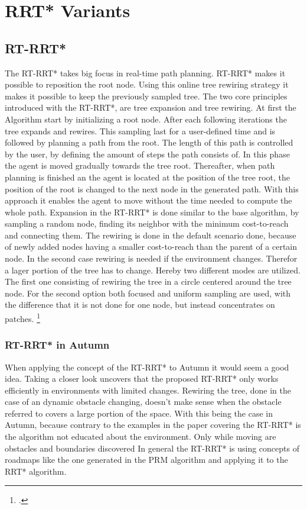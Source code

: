 \section{RRT* Variants}

\subsection{RT-RRT*}

The RT-RRT* takes big focus in real-time path planning. RT-RRT* makes it possible to reposition the root node. Using this online tree rewiring strategy it makes it possible to keep the previously sampled tree.
The two core principles introduced with the RT-RRT*, are tree expansion and tree rewiring. 
At first the Algorithm start by initializing a root node. After each following iterations the tree expands and rewires. This sampling last for a user-defined time and is followed by planning a path from the root. The length of this path is controlled by the user, by defining the amount of steps the path consists of. In this phase the agent is moved gradually towards the tree root. Thereafter, when path planning is finished an the agent is located at the position of the tree root, the position of the root is changed to the next node in the generated path. With this approach it enables the agent to move without the time needed to compute the whole path.
Expansion in the RT-RRT* is done similar to the base algorithm, by sampling a random node, finding its neighbor with the minimum cost-to-reach and connecting them.
The rewiring is done in the default scenario done, because of newly added nodes having a smaller cost-to-reach than the parent of a certain node. In the second case rewiring is needed if the environment changes. Therefor a lager portion of the tree has to change. Hereby two different modes are utilized. The first one consisting of rewiring the tree in a circle centered around the tree node. For the second option both focused and uniform sampling are used, with the difference that it is not done for one node, but instead concentrates on patches.
\footcite{Naderi2015}

\subsubsection{RT-RRT* in Autumn}

When applying the concept of the RT-RRT* to Autumn it would seem a good idea. Taking a closer look uncovers that the proposed RT-RRT* only works efficiently in environments with limited changes. Rewiring the tree, done in the case of an dynamic obstacle changing, doesn't make sense when the obstacle referred to covers a large portion of the space. With this being the case in Autumn, because contrary to the examples in the paper covering the RT-RRT* is the algorithm not educated about the environment. Only while moving are obstacles and boundaries discovered In general the RT-RRT* is using concepts of roadmaps like the one generated in the PRM algorithm and applying it to the RRT* algorithm.  

